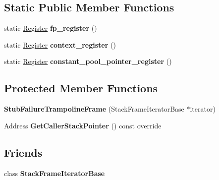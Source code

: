 \subsection*{Static Public Member Functions}
\begin{DoxyCompactItemize}
\item 
static \hyperlink{structv8_1_1internal_1_1_register}{Register} {\bfseries fp\+\_\+register} ()\hypertarget{classv8_1_1internal_1_1_stub_failure_trampoline_frame_a897629cf41f7d5568a0de2765a9debb5}{}\label{classv8_1_1internal_1_1_stub_failure_trampoline_frame_a897629cf41f7d5568a0de2765a9debb5}

\item 
static \hyperlink{structv8_1_1internal_1_1_register}{Register} {\bfseries context\+\_\+register} ()\hypertarget{classv8_1_1internal_1_1_stub_failure_trampoline_frame_a79d4e0f0afde2ec1a19ea1894a7b3fad}{}\label{classv8_1_1internal_1_1_stub_failure_trampoline_frame_a79d4e0f0afde2ec1a19ea1894a7b3fad}

\item 
static \hyperlink{structv8_1_1internal_1_1_register}{Register} {\bfseries constant\+\_\+pool\+\_\+pointer\+\_\+register} ()\hypertarget{classv8_1_1internal_1_1_stub_failure_trampoline_frame_a6dcd5d34714d93db7dc14a330b56866a}{}\label{classv8_1_1internal_1_1_stub_failure_trampoline_frame_a6dcd5d34714d93db7dc14a330b56866a}

\end{DoxyCompactItemize}
\subsection*{Protected Member Functions}
\begin{DoxyCompactItemize}
\item 
{\bfseries Stub\+Failure\+Trampoline\+Frame} (Stack\+Frame\+Iterator\+Base $\ast$iterator)\hypertarget{classv8_1_1internal_1_1_stub_failure_trampoline_frame_a9b61ed5ab4ea6b0c4d72a2dcce88db1f}{}\label{classv8_1_1internal_1_1_stub_failure_trampoline_frame_a9b61ed5ab4ea6b0c4d72a2dcce88db1f}

\item 
Address {\bfseries Get\+Caller\+Stack\+Pointer} () const  override\hypertarget{classv8_1_1internal_1_1_stub_failure_trampoline_frame_a87cab4eabeb36b78191e0c48a872ee56}{}\label{classv8_1_1internal_1_1_stub_failure_trampoline_frame_a87cab4eabeb36b78191e0c48a872ee56}

\end{DoxyCompactItemize}
\subsection*{Friends}
\begin{DoxyCompactItemize}
\item 
class {\bfseries Stack\+Frame\+Iterator\+Base}\hypertarget{classv8_1_1internal_1_1_stub_failure_trampoline_frame_ac7310421866976ca454bbe11c5f926c3}{}\label{classv8_1_1internal_1_1_stub_failure_trampoline_frame_ac7310421866976ca454bbe11c5f926c3}

\end{DoxyCompactItemize}
